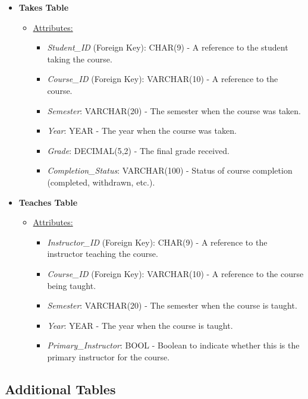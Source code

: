 \documentclass[12pt]{article}
\begin{document}
\begin{itemize}
    \item \textbf{Takes Table}
    \begin{itemize}
        \item \underline{Attributes:}
        \begin{itemize}
            \item \textit{Student\_ID} (Foreign Key): CHAR(9) - A reference to the student taking the course.
            \item \textit{Course\_ID} (Foreign Key): VARCHAR(10) - A reference to the course.
            \item \textit{Semester}: VARCHAR(20) - The semester when the course was taken.
            \item \textit{Year}: YEAR - The year when the course was taken.
            \item \textit{Grade}: DECIMAL(5,2) -  The final grade received.
            \item \textit{Completion\_Status}: VARCHAR(100) - Status of course completion (completed, withdrawn, etc.).
        \end{itemize}
    \end{itemize}
    
    \item \textbf{Teaches Table}
    \begin{itemize}
        \item \underline{Attributes:}
        \begin{itemize}
            \item \textit{Instructor\_ID} (Foreign Key): CHAR(9) - A reference to the instructor teaching the course.
            \item \textit{Course\_ID} (Foreign Key): VARCHAR(10) - A reference to the course being taught.
            \item \textit{Semester}: VARCHAR(20) - The semester when the course is taught.
            \item \textit{Year}: YEAR - The year when the course is taught.
            \item \textit{Primary\_Instructor}: BOOL - Boolean to indicate whether this is the primary instructor for the course.
        \end{itemize}
    \end{itemize}
\end{itemize}

\subsection*{Additional Tables}
\end{document}
